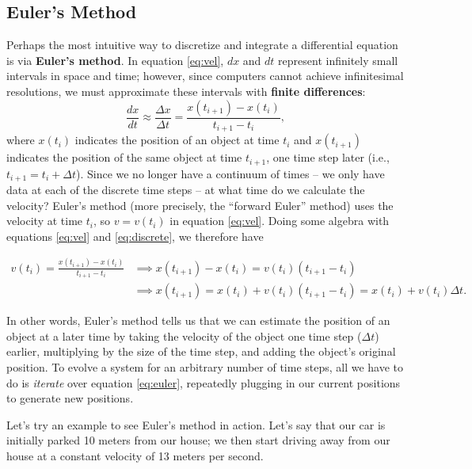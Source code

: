 \documentclass[11pt]{article}
\begin{document}
\subsection{Euler's Method} \label{sec:eulermethod}
Perhaps the most intuitive way to discretize and integrate a differential equation is via \textbf{Euler's method}. In equation \ref{eq:vel}, $dx$ and $dt$ represent infinitely small intervals in space and time; however, since computers cannot achieve infinitesimal resolutions, we must approximate these intervals with \textbf{finite differences}:
\begin{equation} \label{eq:discrete}
    \frac{dx}{dt} \approx \frac{\Delta x}{\Delta t} = \frac{x(t_{i+1}) - x(t_i)}{t_{i+1} - t_i},
\end{equation}
where $x(t_i)$ indicates the position of an object at time $t_i$ and $x(t_{i+1})$ indicates the position of the same object at time $t_{i+1}$, one time step later (i.e., $t_{i+1} = t_i + \Delta t$). Since we no longer have a continuum of times -- we only have data at each of the discrete time steps -- at what time do we calculate the velocity? Euler's method (more precisely, the ``forward Euler'' method) uses the velocity at time $t_i$, so $v = v(t_i)$ in equation \ref{eq:vel}. Doing some algebra with equations \ref{eq:vel} and \ref{eq:discrete}, we therefore have 

\begin{align} \label{eq:euler}
    v(t_i) = \frac{x(t_{i+1}) - x(t_i)}{t_{i+1} - t_i} &\implies x(t_{i+1}) - x(t_i) = v(t_i)(t_{i+1} - t_i) \nonumber \\ &\implies \boxed{x(t_{i+1}) = x(t_i) + v(t_i)(t_{i+1} - t_i) = x(t_i) + v(t_i)\Delta t}.
\end{align}

\noindent
In other words, Euler's method tells us that we can estimate the position of an object at a later time by taking the velocity of the object one time step ($\Delta t$) earlier, multiplying by the size of the time step, and adding the object's original position. To evolve a system for an arbitrary number of time steps, all we have to do is \textit{iterate} over equation \ref{eq:euler}, repeatedly plugging in our current positions to generate new positions.

\medskip \noindent
Let's try an example to see Euler's method in action. Let's say that our car is initially parked 10 meters from our house; we then start driving away from our house at a constant velocity of 13 meters per second.
\end{document}
